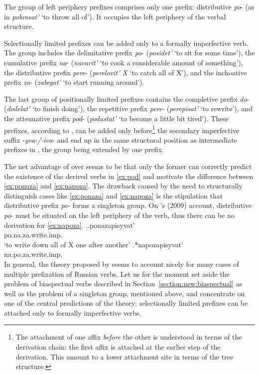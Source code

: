 The group of left periphery prefixes comprises only one prefix: distributive \textit{po}- (as in \textit{pobrosat'} `to throw all of'). It occupies the left periphery of the verbal structure.

Selectionally limited prefixes can be added only to a formally imperfective verb. The group includes the delimitative prefix \textit{po}- (\textit{posidet'} `to sit for some time'), the cumulative prefix \textit{na}- (\textit{navarit'} `to cook a considerable amount of something'), the distributive prefix \textit{pere}- (\textit{perelovit' X} `to catch all of X'), and the inchoative prefix \textit{za}- (\textit{zabegat'} `to start running around').

The last group of positionally limited prefixes contains the completive prefix \textit{do}- (\textit{dodelat'} `to finish doing'), the repetitive prefix \textit{pere}- (\textit{perepisat'} `to rewrite'), and the attenuative prefix \textit{pod}- (\textit{podustat'} `to become a little bit tired'). These prefixes, according to \citet{Tatevosov:09}, can be added only before\footnote{The attachment of one affix \textit{before} the other is understood in terms of the derivation chain: the first affix is attached at the earlier step of the derivation. This amount to a lower attachment site in terms of the tree structure.} the secondary imperfective suffix -\textit{yva-/-iva}- and end up in the same structural position as intermediate prefixes in \citet{Tatevosov:07}, the group being extended by one prefix.
	
The net advantage of \citet{Tatevosov:09} over \citet{Tatevosov:07} seems to be that only the former can correctly predict the existence of the derived verbs in \ref{ex:pod} and motivate the difference between \ref{ex:ponaza} and \ref{ex:napoza}. The drawback caused by the need to structurally distinguish cases like \ref{ex:ponaza} and \ref{ex:napoza} is the stipulation that distributive prefix \textit{po-} forms a singleton group. On \citeauthor{Tatevosov:09}'s (2009) account, distributive \textit{po}- must be situated on the left periphery of the verb, thus there can be no derivation for \ref{ex:napoza}.
\ex.\ag.\label{ex:ponaza}ponazapisyvat'\\
po.na.za.write.imp.\\
\trans `to write down all of X one after another'
\bg.\label{ex:napoza}*napozapisyvat'\\
na.po.za.write.imp.\\

In general, the theory proposed by \citet{Tatevosov:09} seems to account nicely for many cases of multiple prefixation of Russian verbs. Let us for the moment set aside the problem of biaspectual verbs described in Section~\ref{section:new:biaspectual} as well as the problem of a singleton group, mentioned above, and concentrate on one of the central predictions of the theory: selectionally limited prefixes can be attached only to formally imperfective verbs.


